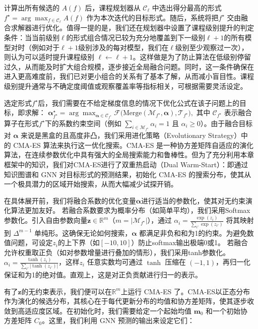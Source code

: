 \documentclass[../main.tex]{subfiles}
\begin{document}
计算出所有候选的 $A(f)$ 后，课程规划器从 $\mathcal{C}_\ell$ 中选出得分最高的形式$f^\star = \arg\max_{f\in\mathcal{C}_\ell} A(f)$ 作为本次迭代的目标形式。随后，系统将把$f^\star$ 交由融合求解器进行优化。值得一提的是，我们还在规划器中设置了课程级别提升的判定条件：当当前级别$\ell$的形式组合情况已较为充分地覆盖到下一级别$\ell+1$的所有模型对时（例如对于$\ell+1$级别涉及的每对模型，我们在$\ell$级别至少观察过一次），则认为可以适时提升课程级别 $\ell \leftarrow \ell+1$。这样做是为了防止算法在低级别停留过久，从而能及时扩大组合规模，逐步接近全局融合问题。同时，这一条件确保在进入更高难度前，我们已对更小组合的关系有了基本了解，从而减小盲目性。课程级别提升通常与不确定度阈值或观察覆盖率等指标相关，可根据需要灵活设定。

选定形式$f^\star$后，我们需要在不给定梯度信息的情况下优化公式在该子问题上的目标，即求解：
$\boldsymbol{\alpha}^\star_{f^\star} = \arg\max_{\boldsymbol{\alpha}\in \mathcal{C}_{f^\star}} \mathcal{F}\Big(\mathrm{Merge}(\mathcal{M}_{f^\star}, \boldsymbol{\alpha}), \mathcal{T}_{f^\star}\Big),$
其中 $\mathcal{C}_{f^\star}$ 表示融合算子在形式$f^\star$下的系数约束空间（例如 $\sum_{i\in \mathcal{M}_{f^\star}} \alpha_i = 1$ 且 $\alpha_i \ge 0$）。由于融合目标对 $\boldsymbol{\alpha}$ 来说是黑盒的且高度非凸，我们采用进化策略（Evolutionary Strategy）中的 CMA-ES 算法来执行这一优化搜索。CMA-ES 是一种协方差矩阵自适应的演化算法，在连续参数优化中具有强大的全局搜索能力和鲁棒性。但为了充分利用本章框架中的知识，我们对CMA-ES进行了双重热启动（Dual Warm-Start）：即通过知识图谱和 GNN 对目标形式的预测结果，初始化 CMA-ES 的搜索分布，使其从一个极具潜力的区域开始搜索，从而大幅减少试探开销。

在具体展开前，我们将融合系数的优化变量$\boldsymbol{\alpha}$进行适当的参数化，使其对无约束演化算法更加友好。
若融合系数要求为概率分布（如简单平均），我们采用Softmax参数化。引入自由参数向量$\mathbf{z}\in \mathbb{R}^m$（$m=|\mathcal{M}_{f^\star}|$），通过 $\alpha_i = \frac{\exp(z_i)}{\sum_{i'} \exp(z_{i'})}$ 将其映射到 $\Delta^{m-1}$ 单纯形。这确保无论如何搜索，$\boldsymbol{\alpha}$ 都满足非负和和为1的约束。为避免数值问题，可设定$z_i$的上下界（如$[-10,10]$）防止softmax输出极端0或1。
若融合允许权重取正负（如对参数增量进行叠加的情形），我们采用tanh参数化。$\alpha_i = \frac{\tanh(z_i)}{\sum_{i'}|\tanh(z_{i'})|}$，这样$z_i$ 任意实数均可通过 $\tanh$ 压缩在 $(-1,1)$，再归一化保证和为1的绝对值。直观上，这是对正负贡献进行归一的表示。

有了$\mathbf{z}$的无约束表示，我们便可以在$\mathbb{R}^m$上运行 CMA-ES 了。CMA-ES以正态分布作为演化的候选分布，其核心在于每代更新分布的均值和协方差矩阵，使其逐步收敛到高适应度区域。在初始化时，我们需要给定一个起始均值 $\mathbf{m}_0$ 和一个初始协方差矩阵 $C_0$。这里，我们利用 GNN 预测的输出来设定它们：
\end{document}
